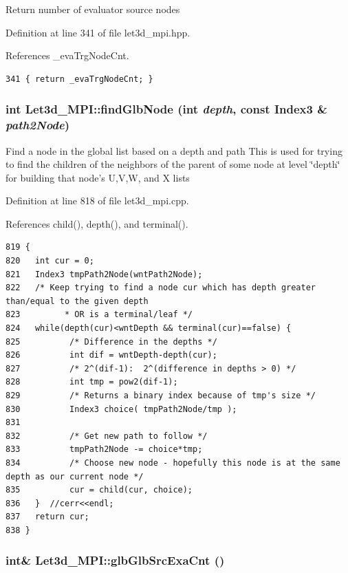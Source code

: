 Return number of evaluator source nodes 

Definition at line 341 of file let3d\_\-mpi.hpp.

References \_\-eva\-Trg\-Node\-Cnt.

\footnotesize\begin{verbatim}341 { return _evaTrgNodeCnt; }
\end{verbatim}\normalsize 


\subsubsection{\setlength{\rightskip}{0pt plus 5cm}int Let3d\_\-MPI::find\-Glb\-Node (int {\em depth}, const Index3 \& {\em path2Node})}\label{classLet3d__MPI_8ae25e5fad1314d14cedf18adc375fa3_8ae25e5fad1314d14cedf18adc375fa3}


Find a node in the global list based on a depth and path This is used for trying to find the children of the neighbors of the parent of some node at level \char`\"{}depth\char`\"{} for building that node's U,V,W, and X lists 

Definition at line 818 of file let3d\_\-mpi.cpp.

References child(), depth(), and terminal().

\footnotesize\begin{verbatim}819 {
820   int cur = 0;  
821   Index3 tmpPath2Node(wntPath2Node);
822   /* Keep trying to find a node cur which has depth greater than/equal to the given depth
823         * OR is a terminal/leaf */
824   while(depth(cur)<wntDepth && terminal(cur)==false) {
825          /* Difference in the depths */
826          int dif = wntDepth-depth(cur);
827          /* 2^(dif-1):  2^(difference in depths > 0) */
828          int tmp = pow2(dif-1);
829          /* Returns a binary index because of tmp's size */
830          Index3 choice( tmpPath2Node/tmp );
831 
832          /* Get new path to follow */
833          tmpPath2Node -= choice*tmp;
834          /* Choose new node - hopefully this node is at the same depth as our current node */
835          cur = child(cur, choice);       
836   }  //cerr<<endl;
837   return cur;
838 }
\end{verbatim}\normalsize 


\subsubsection{\setlength{\rightskip}{0pt plus 5cm}int\& Let3d\_\-MPI::glb\-Glb\-Src\-Exa\-Cnt ()\hspace{0.3cm}{\tt  [inline]}}\label{classLet3d__MPI_1d4278c762704adf15862ec5554f846c_1d4278c762704adf15862ec5554f846c}


